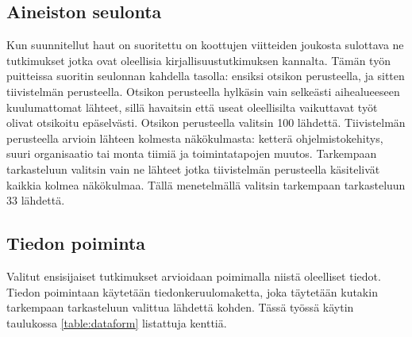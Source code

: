 \subsection{Aineiston seulonta}

Kun suunnitellut haut on suoritettu on koottujen viitteiden joukosta sulottava
ne tutkimukset jotka ovat oleellisia kirjallisuustutkimuksen kannalta. Tämän
työn puitteissa suoritin seulonnan kahdella tasolla: ensiksi otsikon
perusteella, ja sitten tiivistelmän perusteella. Otsikon perusteella hylkäsin
vain selkeästi aihealueeseen kuulumattomat lähteet, sillä havaitsin että useat
oleellisilta vaikuttavat työt olivat otsikoitu epäselvästi. Otsikon perusteella
valitsin 100 lähdettä. Tiivistelmän perusteella arvioin lähteen kolmesta
näkökulmasta: ketterä ohjelmistokehitys, suuri organisaatio tai monta tiimiä ja
toimintatapojen muutos. Tarkempaan tarkasteluun valitsin vain ne lähteet jotka
tiivistelmän perusteella käsitelivät kaikkia kolmea näkökulmaa. Tällä
menetelmällä valitsin tarkempaan tarkasteluun 33 lähdettä.

\subsection{Tiedon poiminta}

Valitut ensisijaiset tutkimukset arvioidaan poimimalla niistä oleelliset tiedot.
Tiedon poimintaan käytetään tiedonkeruulomaketta, joka täytetään kutakin
tarkempaan tarkasteluun valittua lähdettä kohden. Tässä työssä käytin taulukossa
\ref{table:dataform} listattuja kenttiä.

